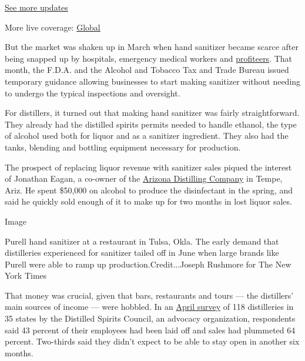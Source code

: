 \href{https://www.nytimes3xbfgragh.onion/live/2020/08/04/business/stock-market-today-coronavirus?action=click\&pgtype=Article\&state=default\&region=MAIN_CONTENT_1\&context=storylines_live_updates}{See
more updates}

More live coverage:
\href{https://www.nytimes3xbfgragh.onion/2020/08/04/world/coronavirus-cases.html?action=click\&pgtype=Article\&state=default\&region=MAIN_CONTENT_1\&context=storylines_live_updates}{Global}

But the market was shaken up in March when hand sanitizer became scarce
after being snapped up by hospitals, emergency medical workers and
\href{https://www.nytimes3xbfgragh.onion/2020/03/14/technology/coronavirus-purell-wipes-amazon-sellers.html}{profiteers}.
That month, the F.D.A. and the Alcohol and Tobacco Tax and Trade Bureau
issued temporary guidance allowing businesses to start making sanitizer
without needing to undergo the typical inspections and oversight.

For distillers, it turned out that making hand sanitizer was fairly
straightforward. They already had the distilled spirits permits needed
to handle ethanol, the type of alcohol used both for liquor and as a
sanitizer ingredient. They also had the tanks, blending and bottling
equipment necessary for production.

The prospect of replacing liquor revenue with sanitizer sales piqued the
interest of Jonathan Eagan, a co-owner of the
\href{https://azdistilling.com/}{Arizona Distilling Company} in Tempe,
Ariz. He spent \$50,000 on alcohol to produce the disinfectant in the
spring, and said he quickly sold enough of it to make up for two months
in lost liquor sales.

Image

Purell hand sanitizer at a restaurant in Tulsa, Okla. The early demand
that distilleries experienced for sanitizer tailed off in June when
large brands like Purell were able to ramp up production.Credit...Joseph
Rushmore for The New York Times

That money was crucial, given that bars, restaurants and tours --- the
distillers' main sources of income --- were hobbled. In an
\href{https://www.distilledspirits.org/news/new-survey-shows-covid-19-creating-severe-financial-hardships-for-craft-distillers/}{April
survey} of 118 distilleries in 35 states by the Distilled Spirits
Council, an advocacy organization, respondents said 43 percent of their
employees had been laid off and sales had plummeted 64 percent.
Two-thirds said they didn't expect to be able to stay open in another
six months.


